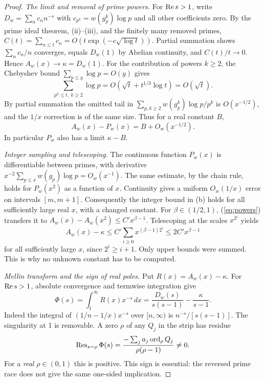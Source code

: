 \documentclass[11pt]{article}
\theoremstyle{remark}\newtheorem{remark}[theorem]{Remark}
\begin{document}
\begin{proof}
\emph{The limit and removal of prime powers.} For $\operatorname{Re} s>1$, write $D_w=\sum_n c_n n^{-s}$ with $c_{p^k}=w(g_p^k)\log p$ and all other coefficients zero. By the prime ideal theorem, (ii)--(iii), and the finitely many removed primes, $C(t)=\sum_{n\le t}c_n=O(t\exp(-c\sqrt{\log t}))$. Partial summation shows $\sum_n c_n/n$ converges, equals $D_w(1)$ by Abelian continuity, and $C(t)/t\to0$. Hence $A_w(x)\to\kappa=D_w(1)$. For the contribution of powers $k\ge2$, the Chebyshev bound $\sum_{p\le y}\log p=O(y)$ gives
\[
\sum_{p^k\le t,\ k\ge2}\log p=O(\sqrt t+t^{1/3}\log t)=O(\sqrt t).
\]
By partial summation the omitted tail in $\sum_{p,k\ge2}w(g_p^k)\log p/p^k$ is $O(x^{-1/2})$, and the $1/x$ correction is of the same size. Thus for a real constant $B$,
\begin{equation}\label{eq:powers}
 A_w(x)-P_w(x)=B+O_w(x^{-1/2}).
\end{equation}
In particular $P_w$ also has a limit $\kappa-B$.

\emph{Integer sampling and telescoping.} The continuous function $P_w(x)$ is differentiable between primes, with derivative $x^{-2}\sum_{p\le x}w(g_p)\log p=O_w(x^{-1})$. The same estimate, by the chain rule, holds for $P_w(x^2)$ as a function of $x$. Continuity gives a uniform $O_w(1/x)$ error on intervals $[m,m+1]$. Consequently the integer bound in (b) holds for all sufficiently large real $x$, with a changed constant. For $\beta\in(1/2,1)$, (\ref{eq:powers}) transfers it to $A_w(x)-A_w(x^2)\le C' x^{\beta-1}$. Telescoping at the scales $x^{2^i}$ yields
\begin{equation}\label{eq:telescoping}
 A_w(x)-\kappa\le C'\sum_{i\ge0}x^{(\beta-1)2^i}\le 2C'x^{\beta-1}
\end{equation}
for all sufficiently large $x$, since $2^i\ge i+1$. Only upper bounds were summed. This is why no unknown constant has to be computed.

\emph{Mellin transform and the sign of real poles.} Put $R(x)=A_w(x)-\kappa$. For $\operatorname{Re} s>1$, absolute convergence and termwise integration give
\begin{equation}\label{eq:mellin}
 \Phi(s)=\int_1^\infty R(x)x^{-s}\,dx
 =\frac{D_w(s)}{s(s-1)}-\frac{\kappa}{s-1}.
\end{equation}
Indeed the integral of $(1/n-1/x)x^{-s}$ over $[n,\infty)$ is $n^{-s}/[s(s-1)]$. The singularity at 1 is removable. A zero $\rho$ of any $Q_j$ in the strip has residue
\begin{equation}\label{eq:residue}
 \operatorname{Res}_{s=\rho}\Phi(s)=\frac{-\sum_j a_j\operatorname{ord}_\rho Q_j}{\rho(\rho-1)}\ne0.
\end{equation}
For a \emph{real} $\rho\in(0,1)$ this is positive. This sign is essential: the reversed prime race does not give the same one-sided implication.


\end{proof}
\end{document}
